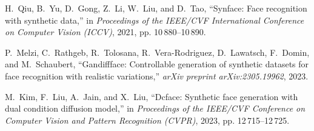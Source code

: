 \documentclass[journal]{IEEEtran}
\begin{document}
\begin{thebibliography}{100}
H.~Qiu, B.~Yu, D.~Gong, Z.~Li, W.~Liu, and D.~Tao, ``Synface: Face recognition
with synthetic data,'' in \emph{Proceedings of the IEEE/CVF International Conference on Computer Vision (ICCV)}, 2021, pp. 10\,880--10\,890.

P.~Melzi, C.~Rathgeb, R.~Tolosana, R.~Vera-Rodriguez, D.~Lawatsch, F.~Domin,
and M.~Schaubert, ``Gandiffface: Controllable generation of synthetic datasets for face recognition with realistic variations,'' \emph{arXiv
preprint arXiv:2305.19962}, 2023.

M.~Kim, F.~Liu, A.~Jain, and X.~Liu, ``Dcface: Synthetic face generation with dual condition diffusion model,'' in \emph{Proceedings of the IEEE/CVF Conference on Computer Vision and Pattern Recognition (CVPR)}, 2023, pp.
12\,715--12\,725.

\end{thebibliography}
\end{document}
